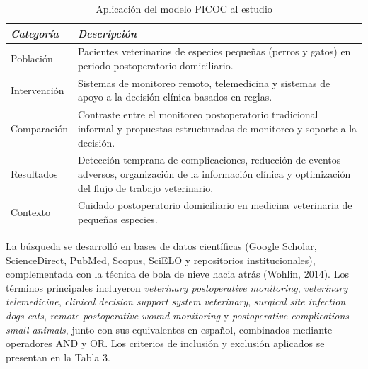 \documentclass[stu, spanish]{apa7}
\begin{document}
\begin{table}[htbp]
\caption{Aplicaci\'{o}n del modelo PICOC al estudio}
\label{tab:picoc}
\footnotesize
\begin{tabular}{@{}lp{10cm}@{}}
\toprule
\textit{Categor\'{i}a} & \textit{Descripci\'{o}n} \\
\midrule
Poblaci\'{o}n     & Pacientes veterinarios de especies peque\~{n}as (perros y gatos) en periodo postoperatorio domiciliario. \\
Intervenci\'{o}n  & Sistemas de monitoreo remoto, telemedicina y sistemas de apoyo a la decisi\'{o}n cl\'{i}nica basados en reglas. \\
Comparaci\'{o}n   & Contraste entre el monitoreo postoperatorio tradicional informal y propuestas estructuradas de monitoreo y soporte a la decisi\'{o}n. \\
Resultados      & Detecci\'{o}n temprana de complicaciones, reducci\'{o}n de eventos adversos, organizaci\'{o}n de la informaci\'{o}n cl\'{i}nica y optimizaci\'{o}n del flujo de trabajo veterinario. \\
Contexto        & Cuidado postoperatorio domiciliario en medicina veterinaria de peque\~{n}as especies. \\
\bottomrule
\end{tabular}
\end{table}

La b\'{u}squeda se desarroll\'{o} en bases de datos cient\'{i}ficas (Google Scholar, ScienceDirect, PubMed, Scopus, SciELO y repositorios institucionales), complementada con la t\'{e}cnica de bola de nieve hacia atr\'{a}s (Wohlin, 2014). Los t\'{e}rminos principales incluyeron \textit{veterinary postoperative monitoring}, \textit{veterinary telemedicine}, \textit{clinical decision support system veterinary}, \textit{surgical site infection dogs cats}, \textit{remote postoperative wound monitoring} y \textit{postoperative complications small animals}, junto con sus equivalentes en espa\~{n}ol, combinados mediante operadores AND y OR. Los criterios de inclusi\'{o}n y exclusi\'{o}n aplicados se presentan en la Tabla 3.
\end{document}
